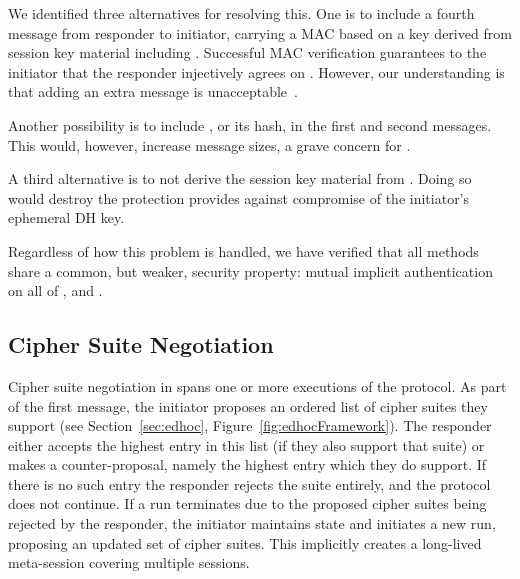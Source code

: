 \documentclass[runningheads, envcountsame, hidelinks, a4paper, x11names]{llncs}
\begin{document}
We identified three alternatives for resolving this.
%
One is to include a fourth message from responder to initiator,
carrying a MAC based on a key derived from session key
material including \mGiy{}.
%
Successful MAC verification guarantees
to the initiator that the responder injectively agrees on \mGiy{}.
%
However, our understanding is that adding an extra message is
unacceptable~\cite{personalCommunication}.
%

Another possibility is to include \mGi{}, or its hash, in the first and
second messages.
%
This would, however, increase message sizes, a grave concern for \mEdhoc{}.
%

A third alternative is to not derive the session key material from \mGiy{}.
%
Doing so would destroy the protection \mOptls{} provides against compromise
of the initiator's ephemeral DH key.
%

Regardless of how this problem is handled, we have verified that all methods
share a common, but weaker, security property: mutual implicit authentication
on all of \mGxy{}, \mGiy{} and \mGrx{}.
%

\subsection{Cipher Suite Negotiation}
\label{sec:ciphersuiteNegotiation}
%

Cipher suite negotiation in \mEdhoc{} spans one or more executions of the
protocol.
%
As part of the first message, the initiator proposes an ordered list of cipher suites they support (see Section~\ref{sec:edhoc}, Figure~\ref{fig:edhocFramework}). The responder either accepts the highest entry in this list (if they also support that suite) or makes a counter-proposal, namely the highest entry which they do support. If there is no such entry the responder rejects the suite entirely, and the protocol does not continue. 
%
If a run terminates due to the proposed cipher suites being rejected by the
responder, the initiator maintains state and initiates a new run, proposing
an updated set of cipher suites.
%
This implicitly creates a long-lived
meta-session covering multiple \mEdhoc{} sessions.
%
%
\end{document}

